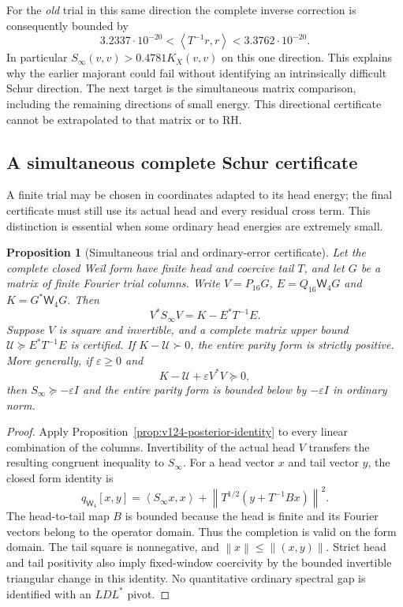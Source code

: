\documentclass[11pt]{article}
\newtheorem{proposition}[theorem]{Proposition}
\theoremstyle{remark}
\newcommand{\norm}[1]{\left\lVert #1\right\rVert}
\newcommand{\ip}[2]{\left\langle #1,#2\right\rangle}
\begin{document}
For the \emph{old} trial in this same direction the complete inverse
correction is consequently bounded by
\[
 3.2337\cdot10^{-20}<\ip{T^{-1}r}{r}
       <3.3762\cdot10^{-20}.
\]
In particular $S_\infty(v,v)>0.4781K_X(v,v)$ on this one
direction. This explains why the earlier majorant could fail
without identifying an intrinsically difficult Schur direction.
The next target is the simultaneous matrix comparison, including
the remaining directions of small energy. This directional
certificate cannot be extrapolated to that matrix or to RH.

\subsection*{A simultaneous complete Schur certificate}

A finite trial may be chosen in coordinates adapted to its head energy;
the final certificate must still use its actual head and every residual
cross term.  This distinction is essential when some ordinary head
energies are extremely small.

\begin{proposition}[Simultaneous trial and ordinary-error certificate]
\label{prop:v125-simultaneous}
Let the complete closed Weil form have finite head and coercive tail
$T$, and let $G$ be a matrix of finite Fourier trial columns.  Write
$V=P_{16}G$, $E=Q_{16}\mathsf W_4G$ and $K=G^*\mathsf W_4G$.
Then
\begin{equation}\label{eq:v125-simultaneous}
 V^*S_\infty V=K-E^*T^{-1}E.
\end{equation}
Suppose $V$ is square and invertible, and a complete matrix upper bound
$\mathcal U\succeq E^*T^{-1}E$ is certified.  If
$K-\mathcal U\succ0$, the entire parity form is strictly positive.
More generally, if $\varepsilon\ge0$ and
\[
 K-\mathcal U+\varepsilon V^*V\succeq0,
\]
then $S_\infty\succeq-\varepsilon I$ and the entire parity form is
bounded below by $-\varepsilon I$ in ordinary norm.
\end{proposition}
\begin{proof}
Apply Proposition~\ref{prop:v124-posterior-identity} to every linear
combination of the columns.  Invertibility of the actual head $V$
transfers the resulting congruent inequality to $S_\infty$.
For a head vector $x$ and tail vector $y$, the closed form identity is
\[
 q_{\mathsf W_4}[x,y]
 =\ip{S_\infty x}{x}
   +\norm{T^{1/2}(y+T^{-1}Bx)}^2.
\]
The head-to-tail map $B$ is bounded because the head is finite
and its Fourier vectors belong to the operator domain.  Thus the
completion is valid on the form domain.  The tail square is
nonnegative, and $\norm{x}\le\norm{(x,y)}$.  Strict head and tail
positivity also imply fixed-window coercivity by the bounded
invertible triangular change in this identity.  No quantitative
ordinary spectral gap is identified with an $LDL^*$ pivot.
\end{proof}
\end{document}
